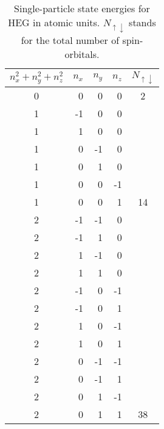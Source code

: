 \begin{table}[!ht]
	\begin{center}
		\begin{tabular}{ |c | r | r | r | c|} 
			\hline
			$n_x^2+n_y^2+n_z^2$& $n_x$ & $n_y$ & $n_z$ & $N_{\uparrow \downarrow}$ \\
			\hline
			\hline
			0& 0  & 0  & 0  & 2 \\ \hline
			1& -1 & 0  & 0  &  \\ 
			1& 1  & 0  & 0  &  \\ 
			1& 0  & -1 & 0  &  \\ 
			1& 0  & 1  & 0  &  \\ 
			1& 0  & 0  & -1 &  \\ 
			1& 0  & 0  & 1  & 14 \\ 	\hline
			2& -1 & -1 & 0  &  \\ 
			2& -1 & 1  & 0  &  \\ 
			2& 1  & -1 & 0  &  \\ 
			2& 1  & 1  & 0  &  \\ 
			2& -1 & 0  & -1 &  \\ 
			2& -1 & 0  & 1  &  \\ 
			2& 1  & 0  & -1 &  \\ 
			2& 1  & 0  & 1  &  \\ 
			2& 0  & -1 & -1 &  \\ 
			2& 0  & -1 & 1  &  \\ 
			2& 0  & 1  & -1 &  \\ 
			2& 0  & 1  & 1  & 38 \\ 	\hline
		\end{tabular} 
		\caption{Single-particle state energies for HEG in atomic units. $N_{\uparrow \downarrow }$ stands for the total number of spin-orbitals.}
		\label{tab:spnumbers}
	\end{center}
\end{table}

